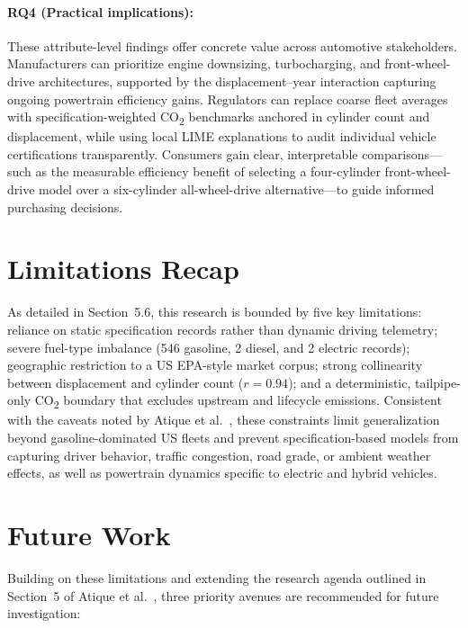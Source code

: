 \paragraph{RQ4 (Practical implications):}
These attribute-level findings offer concrete value across automotive stakeholders. Manufacturers can prioritize engine downsizing, turbocharging, and front-wheel-drive architectures, supported by the displacement--year interaction capturing ongoing powertrain efficiency gains. Regulators can replace coarse fleet averages with specification-weighted CO\textsubscript{2} benchmarks anchored in cylinder count and displacement, while using local LIME explanations to audit individual vehicle certifications transparently. Consumers gain clear, interpretable comparisons---such as the measurable efficiency benefit of selecting a four-cylinder front-wheel-drive model over a six-cylinder all-wheel-drive alternative---to guide informed purchasing decisions.


\section{Limitations Recap}

As detailed in Section~5.6, this research is bounded by five key limitations: reliance on static specification records rather than dynamic driving telemetry; severe fuel-type imbalance (546 gasoline, 2 diesel, and 2 electric records); geographic restriction to a US EPA-style market corpus; strong collinearity between displacement and cylinder count (\(r = 0.94\)); and a deterministic, tailpipe-only CO\textsubscript{2} boundary that excludes upstream and lifecycle emissions. Consistent with the caveats noted by Atique et al.~\cite{atique2026explainable}, these constraints limit generalization beyond gasoline-dominated US fleets and prevent specification-based models from capturing driver behavior, traffic congestion, road grade, or ambient weather effects, as well as powertrain dynamics specific to electric and hybrid vehicles.


\section{Future Work}

Building on these limitations and extending the research agenda outlined in Section~5 of Atique et al.~\cite{atique2026explainable}, three priority avenues are recommended for future investigation:

